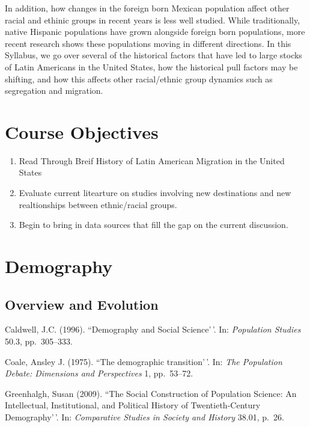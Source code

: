 \documentclass[11pt,]{article}
\begin{document}
In addition, how changes in the foreign born Mexican population affect
other racial and ethinic groups in recent years is less well studied.
While traditionally, native Hispanic populations have grown alongside
foreign born populations, more recent research shows these populations
moving in different directions. In this Syllabus, we go over several of
the historical factors that have led to large stocks of Latin Americans
in the United States, how the historical pull factors may be shifting,
and how this affects other racial/ethnic group dynamics such as
segregation and migration.

\hypertarget{course-objectives}{%
\section{Course Objectives}\label{course-objectives}}

\begin{enumerate}
\def\labelenumi{\arabic{enumi}.}
\item
  Read Through Breif History of Latin American Migration in the United
  States
\item
  Evaluate current litearture on studies involving new destinations and
  new realtionships between ethnic/racial groups.
\item
  Begin to bring in data sources that fill the gap on the current
  discussion.
\end{enumerate}

\hypertarget{demography}{%
\section{Demography}\label{demography}}

\hypertarget{overview-and-evolution}{%
\subsection{Overview and Evolution}\label{overview-and-evolution}}

Caldwell, J.C. (1996). ``Demography and Social Science'\,'. In:
\emph{Population Studies} 50.3, pp.~305--333.

Coale, Ansley J. (1975). ``The demographic transition'\,'. In:
\emph{The Population Debate: Dimensions and Perspectives} 1, pp.~53--72.

Greenhalgh, Susan (2009). ``The Social Construction of Population
Science: An Intellectual, Institutional, and Political History of
Twentieth-Century Demography'\,'. In:
\emph{Comparative Studies in Society and History} 38.01, p.~26.
\end{document}
